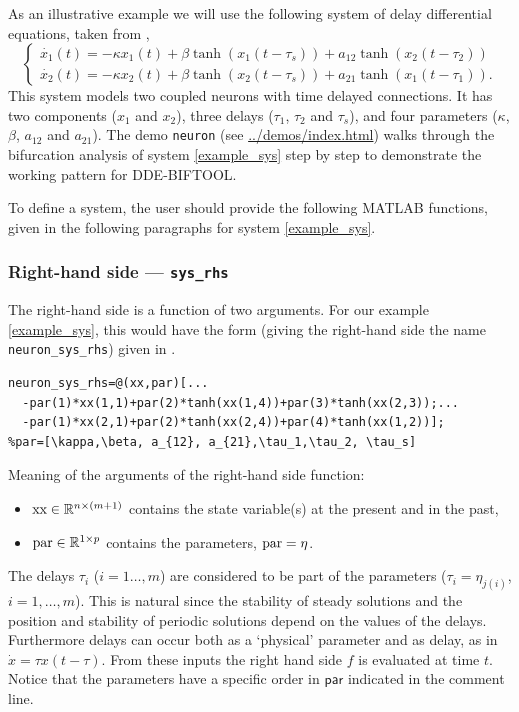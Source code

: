 \documentclass[10pt]{scrartcl}
\newcommand{\DDEBIFCODE}{\textsc{DDE-BIFTOOL}}
\newcommand{\parm}[1]{\mathsf{#1}}
\newcommand{\demobase}{\url{../demos/index.html}}
\newcommand{\RR}{\mathbb{R}}
\newcommand{\blist}[1]{\mbox{\lstinline!#1!}}
\begin{document}
As an illustrative example we will use the following system of delay 
differential
equations, taken from \cite{Shay99},
\begin{equation}\label{example_sys}
\left\{
\begin{array}{l}
\dot{x_1}(t)=-\kappa x_1(t)+\beta \tanh(x_1(t-\tau_s))+a_{12}\tanh(x_2(t-\tau_2)) \\
\dot{x_2}(t)=-\kappa x_2(t)+\beta \tanh(x_2(t-\tau_s))+a_{21}\tanh(x_1(t-\tau_1)) .
\end{array}
\right.
\end{equation}
This system models two coupled neurons with time delayed connections.
It has two components ($x_1$ and $x_2$), three delays ($\tau_1$,
$\tau_2$ and $\tau_s$), and four parameters ($\kappa$, $\beta$,
$a_{12}$ and $a_{21}$).  The demo \texttt{neuron} (see
\demobase{}) walks through the
bifurcation analysis of system \eqref{example_sys} step by step to
demonstrate the working pattern for \DDEBIFCODE.

To define a system, the user should provide the following MATLAB
functions, given in the following paragraphs for system \eqref{example_sys}.

\subsubsection{Right-hand side --- \texorpdfstring{\blist{sys_rhs}}{sys\_rhs}}\label{sec:constrhs} 
The right-hand side is a function of two arguments. For our example
\eqref{example_sys}, this would have the form (giving the right-hand
side the name \blist{neuron_sys_rhs}) given in .
\begin{lstlisting}[float,frame=lines,label=neuron_sys_rhs,caption={Definition for right-hand side of \eqref{example_sys} as a variable. See \Cref{neuron_sys_rhs_vec} for the vectorized version.}]
neuron_sys_rhs=@(xx,par)[...
  -par(1)*xx(1,1)+par(2)*tanh(xx(1,4))+par(3)*tanh(xx(2,3));...
  -par(1)*xx(2,1)+par(2)*tanh(xx(2,4))+par(4)*tanh(xx(1,2))];  
%par=[\kappa,\beta, a_{12}, a_{21},\tau_1,\tau_2, \tau_s]
\end{lstlisting}
Meaning of the arguments of the right-hand side function:
\begin{itemize}
\item $\blist{xx}\in\RR^{n\times (m+1)}$ contains the state
variable(s) at the present and in the past,
\item $\blist{par}\in\RR^{1\times
  p}$ contains the parameters, $\blist{par}=\eta$.
\end{itemize}
The delays $\tau_i$ ($i=1\ldots,m$) are considered to be part of the
parameters ($\tau_i=\eta_{j(i)}$, $i=1,\ldots,m$).  This is natural
since the stability of steady solutions and the position and stability
of periodic solutions depend on the values of the delays.  Furthermore
delays can occur both as a `physical' parameter and as delay, as in
$\dot{x}=\tau x(t-\tau)$.  From these inputs the right hand side $f$
is evaluated at time $t$. Notice that the parameters have a specific
order in $\parm{par}$ indicated in the comment line.
\end{document}
